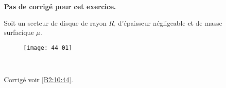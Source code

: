 \normaltrue \difficilefalse \tdifficilefalse
\correctionfalse


\setcounter{numques}{0}
\ifcorrection
\else
\textbf{Pas de corrigé pour cet exercice.}
\fi




\ifprof
\else
Soit un secteur de disque de rayon $R$, d'épaisseur négligeable et de masse surfacique $\mu$. 
\begin{figure}[H]
\centering
\texttt{[image: 44\_01]}
\end{figure}
\fi


\ifprof
\else
\fi

\ifprof ~\\
\else
\fi


\ifprof
\else
\begin{flushright}
\footnotesize{Corrigé voir \ref{B2:10:44}.}
\end{flushright}%
\fi